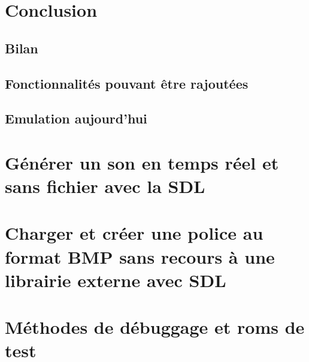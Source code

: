 \documentclass{report}
\begin{document}
\chapter{Conclusion}
\section{Bilan}
\section{Fonctionnalités pouvant être rajoutées}
\section{Emulation aujourd'hui}


\appendix
\chapter{Générer un son en temps réel et sans fichier avec la SDL}
\chapter{Charger et créer une police au format BMP sans recours à une librairie externe avec SDL}
\chapter{Méthodes de débuggage et roms de test}
\end{document}
